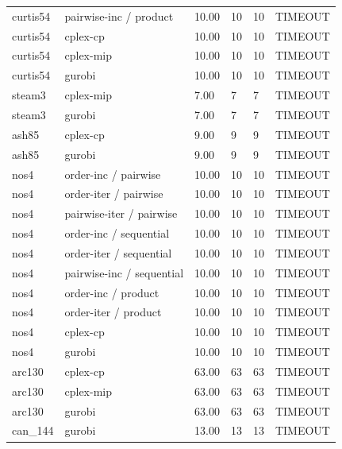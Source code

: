 \begin{tabular}{llllll}
curtis54 & pairwise-inc / product & 10.00 & 10 & 10 & TIMEOUT \\
curtis54 & cplex-cp & 10.00 & 10 & 10 & TIMEOUT \\
curtis54 & cplex-mip & 10.00 & 10 & 10 & TIMEOUT \\
curtis54 & gurobi & 10.00 & 10 & 10 & TIMEOUT \\
steam3 & cplex-mip & 7.00 & 7 & 7 & TIMEOUT \\
steam3 & gurobi & 7.00 & 7 & 7 & TIMEOUT \\
ash85 & cplex-cp & 9.00 & 9 & 9 & TIMEOUT \\
ash85 & gurobi & 9.00 & 9 & 9 & TIMEOUT \\
nos4 & order-inc / pairwise & 10.00 & 10 & 10 & TIMEOUT \\
nos4 & order-iter / pairwise & 10.00 & 10 & 10 & TIMEOUT \\
nos4 & pairwise-iter / pairwise & 10.00 & 10 & 10 & TIMEOUT \\
nos4 & order-inc / sequential & 10.00 & 10 & 10 & TIMEOUT \\
nos4 & order-iter / sequential & 10.00 & 10 & 10 & TIMEOUT \\
nos4 & pairwise-inc / sequential & 10.00 & 10 & 10 & TIMEOUT \\
nos4 & order-inc / product & 10.00 & 10 & 10 & TIMEOUT \\
nos4 & order-iter / product & 10.00 & 10 & 10 & TIMEOUT \\
nos4 & cplex-cp & 10.00 & 10 & 10 & TIMEOUT \\
nos4 & gurobi & 10.00 & 10 & 10 & TIMEOUT \\
arc130 & cplex-cp & 63.00 & 63 & 63 & TIMEOUT \\
arc130 & cplex-mip & 63.00 & 63 & 63 & TIMEOUT \\
arc130 & gurobi & 63.00 & 63 & 63 & TIMEOUT \\
can\_144 & gurobi & 13.00 & 13 & 13 & TIMEOUT \\
\hline
\end{tabular}
